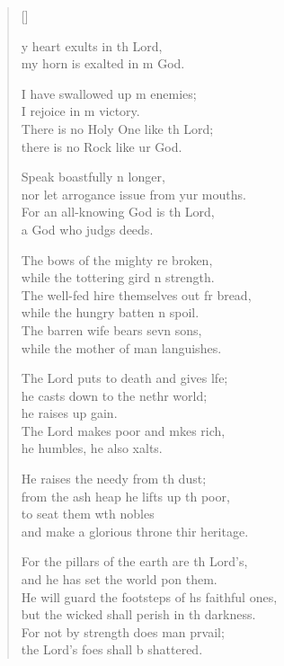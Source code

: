 \settowidth{\versewidth}{He will guard the footsteps of his faithful ones, *}
\begin{verse}[\versewidth]
  \begin{patverse}
    y heart exults in th Lord,\Med\\
my horn is exalted in m God.

I have swallowed up m enemies;\Med\\
I rejoice in m victory.\\
There is no Holy One like th Lord;\Med\\
there is no Rock like ur God.

Speak boastfully n longer,\Med\\
nor let arrogance issue from yur mouths.\\
For an all-knowing God is th Lord,\Med\\
a God who judgs deeds.

The bows of the mighty re broken,\Med\\
while the tottering gird n strength.\\
The well-fed hire themselves out fr bread,\Med\\
while the hungry batten n spoil.\\
The barren wife bears sevn sons,\Med\\
while the mother of man languishes.

The Lord puts to death and gives l\pointup{\i}fe;\Flex\\
he casts down to the nethr world;\Med\\
he raises up gain.\\
The Lord makes poor and mkes rich,\Med\\
he humbles, he also xalts.

He raises the needy from th dust;\Med\\
from the ash heap he lifts up th poor,\\
to seat them w\pointup{\i}th nobles\Med\\
and make a glorious throne thir heritage.

For the pillars of the earth are th Lord’s,\Med\\
and he has set the world pon them.\\
He will guard the footsteps of h\pointup{\i}s faithful ones,\Med\\
but the wicked shall perish in th darkness.\\
For not by strength does man prvail;\Med\\
the Lord’s foes shall b shattered.


\end{patverse}
\end{verse}
